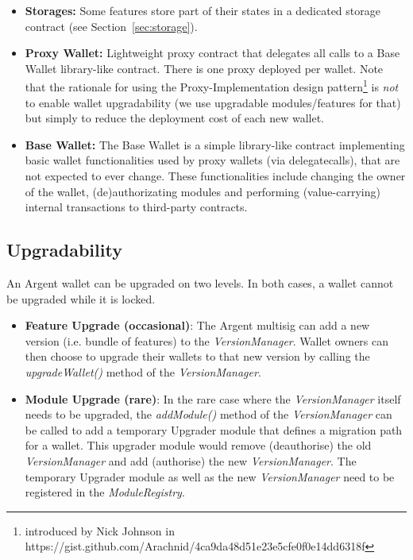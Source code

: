 \documentclass[12pt]{article}
\begin{document}
\begin{itemize}
    \item \textbf{Storages:} Some features store part of their states in a dedicated storage contract (see Section~\ref{sec:storage}).
    \item \textbf{Proxy Wallet:} Lightweight proxy contract that delegates all calls to a Base Wallet library-like contract. There is one proxy deployed per wallet. Note that the rationale for using the Proxy-Implementation design pattern\footnote{ introduced by Nick Johnson in https://gist.github.com/Arachnid/4ca9da48d51e23e5cfe0f0e14dd6318f} is \emph{not} to enable wallet upgradability (we use upgradable modules/features for that) but simply to reduce the deployment cost of each new wallet.
    \item \textbf{Base Wallet:} The Base Wallet is a simple library-like contract implementing basic wallet functionalities used by proxy wallets (via delegatecalls), that are not expected to ever change. These functionalities include changing the owner of the wallet, (de)authorizating modules and performing (value-carrying) internal transactions to third-party contracts.
\end{itemize}


\subsection{Upgradability}
\label{sec:upgradability}
An Argent wallet can be upgraded on two levels. In both cases, a wallet cannot be upgraded while it is locked.
\begin{itemize}
    \item \textbf{Feature Upgrade (occasional)}:
The Argent multisig can add a new version (i.e. bundle of features) to the \emph{VersionManager}. Wallet owners can then choose to upgrade their wallets to that new version by calling the \emph{upgradeWallet()} method of the \emph{VersionManager}.
    \item \textbf{Module Upgrade (rare)}:
In the rare case where the \emph{VersionManager} itself needs to be upgraded, the \emph{addModule()} method of the \emph{VersionManager} can be called to add a temporary Upgrader module that defines a migration path for a wallet. This upgrader module would remove (deauthorise) the old \emph{VersionManager} and add (authorise) the new \emph{VersionManager}. The temporary Upgrader module as well as the new \emph{VersionManager} need to be registered in the \emph{ModuleRegistry}. 
\end{itemize}
\end{document}
